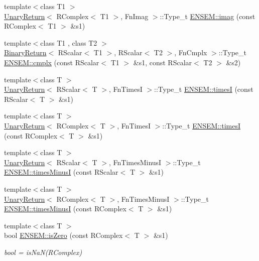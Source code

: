 \begin{DoxyCompactItemize}
{\footnotesize template$<$class T1 $>$ }\\\mbox{\hyperlink{structUnaryReturn}{Unary\+Return}}$<$ R\+Complex$<$ T1 $>$, Fn\+Imag $>$\+::Type\+\_\+t \mbox{\hyperlink{group__rcomplex_ga983adfaddb65779a64c1a6d201bea704}{E\+N\+S\+E\+M\+::imag}} (const R\+Complex$<$ T1 $>$ \&s1)
\item 
{\footnotesize template$<$class T1 , class T2 $>$ }\\\mbox{\hyperlink{structBinaryReturn}{Binary\+Return}}$<$ R\+Scalar$<$ T1 $>$, R\+Scalar$<$ T2 $>$, Fn\+Cmplx $>$\+::Type\+\_\+t \mbox{\hyperlink{group__rcomplex_gae6f982df6dd1eba378ad74676dc96bba}{E\+N\+S\+E\+M\+::cmplx}} (const R\+Scalar$<$ T1 $>$ \&s1, const R\+Scalar$<$ T2 $>$ \&s2)
\item 
{\footnotesize template$<$class T $>$ }\\\mbox{\hyperlink{structUnaryReturn}{Unary\+Return}}$<$ R\+Scalar$<$ T $>$, Fn\+TimesI $>$\+::Type\+\_\+t \mbox{\hyperlink{group__rcomplex_ga1741ab434937b21a3f54881161f429aa}{E\+N\+S\+E\+M\+::timesI}} (const R\+Scalar$<$ T $>$ \&s1)
\item 
{\footnotesize template$<$class T $>$ }\\\mbox{\hyperlink{structUnaryReturn}{Unary\+Return}}$<$ R\+Complex$<$ T $>$, Fn\+TimesI $>$\+::Type\+\_\+t \mbox{\hyperlink{group__rcomplex_gaf442aefeacd8aece996f6a9d9028d72e}{E\+N\+S\+E\+M\+::timesI}} (const R\+Complex$<$ T $>$ \&s1)
\item 
{\footnotesize template$<$class T $>$ }\\\mbox{\hyperlink{structUnaryReturn}{Unary\+Return}}$<$ R\+Scalar$<$ T $>$, Fn\+Times\+MinusI $>$\+::Type\+\_\+t \mbox{\hyperlink{group__rcomplex_gaf58bc5b02a5a7fed1251f5ad0f33325a}{E\+N\+S\+E\+M\+::times\+MinusI}} (const R\+Scalar$<$ T $>$ \&s1)
\item 
{\footnotesize template$<$class T $>$ }\\\mbox{\hyperlink{structUnaryReturn}{Unary\+Return}}$<$ R\+Complex$<$ T $>$, Fn\+Times\+MinusI $>$\+::Type\+\_\+t \mbox{\hyperlink{group__rcomplex_ga630dbd8479e9fe488cbf493531594f06}{E\+N\+S\+E\+M\+::times\+MinusI}} (const R\+Complex$<$ T $>$ \&s1)
\item 
{\footnotesize template$<$class T $>$ }\\bool \mbox{\hyperlink{group__rcomplex_ga21235851ad3c6bba4973c55332baaa9e}{E\+N\+S\+E\+M\+::is\+Zero}} (const R\+Complex$<$ T $>$ \&s1)
\begin{DoxyCompactList}\small\item\em bool = is\+Na\+N(\+R\+Complex) \end{DoxyCompactList}\item 

\end{DoxyCompactItemize}
